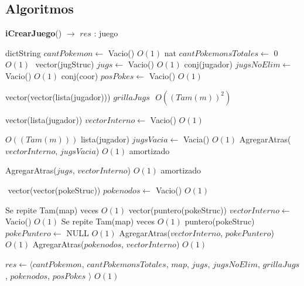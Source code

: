 \begin{Algoritmos}
\subsection{Algoritmos}

\begin{algorithm}[H]
{\textbf{iCrearJuego}() $\to$ $res$ : juego}
\begin{algorithmic}[1]

\State dictString $cantPokemon \gets $ Vacio()  \Comment $O(1)$
\State nat $cantPokemonsTotales \gets $ 0  \Comment $O(1)$
$ $\newline
\State vector(jugStruc)  $jugs \gets$ Vacio()     \Comment $O(1)$
\State conj(jugador) $jugsNoElim \gets$ Vacio()     \Comment $O(1)$
\State conj(coor) $posPokes \gets$ Vacio()     \Comment $O(1)$

\State vector(vector(lista(jugador)))   $grillaJugs$
$ $\newline
{} \Comment $O((Tam(m))^2)$
    
    \State vector(lista(jugador)) $vectorInterno \gets$ Vacio()  \Comment $O(1)$
    
      \Comment $O((Tam(m)))$
        \State lista(jugador) $jugsVacia \gets$ Vacia()   \Comment $O(1)$
        \State AgregarAtras($vectorInterno$, $jugsVacia$) \Comment $O(1)$ amortizado
    \EndFor
    
    AgregarAtras($jugs$, $vectorInterno$)   \Comment $O(1)$ amortizado

\EndFor
$ $\newline
\State vector(vector(pokeStruc))  $pokenodos \gets$ Vacio()  \Comment $O(1)$

       \Comment Se repite Tam(map) veces $O(1)$
    \State vector(puntero(pokeStruc)) $vectorInterno \gets$ Vacio()  \Comment $O(1)$
        \Comment Se repite Tam(map) veces $O(1)$
        \State puntero(pokeStruc) $pokePuntero \gets$ NULL   \Comment $O(1)$
        \State AgregarAtras($vectorInterno$, $pokePuntero$) \Comment $O(1)$
    \EndFor
    AgregarAtras($pokenodos$, $vectorInterno$)   \Comment $O(1)$
\EndFor

\State $res \gets \langle cantPokemon$, $cantPokemonsTotales$, $map$, $jugs$, $jugsNoElim$, $grillaJugs$, $pokenodos$, $posPokes$ $\rangle$   \Comment $O(1)$


\end{algorithmic}
\end{algorithm}
\end{Algoritmos}
